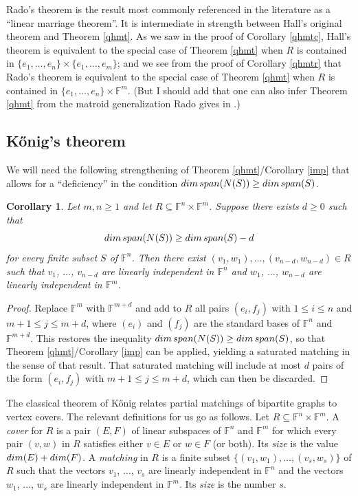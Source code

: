 \documentclass[10pt,a4paper]{amsart}
\newtheorem{cor}[thm]{Corollary}
\begin{document}
Rado's theorem is the result most commonly referenced in the literature as a ``linear marriage theorem''. It is intermediate in strength between Hall's original theorem and Theorem \ref{qhmt}. As we saw in the proof of Corollary \ref{qhmtc}, Hall's theorem is equivalent to the special case of Theorem \ref{qhmt} when $R$ is contained in $\{e_1, \ldots, e_n\} \times \{e_1, \ldots, e_m\}$; and we see from the proof of Corollary \ref{qhmtr} that Rado's theorem is equivalent to the special case of Theorem \ref{qhmt} when $R$ is contained in $\{e_1, \ldots, e_n\} \times \mathbb{F}^m$. (But I should add that one can also infer Theorem \ref{qhmt} from the matroid generalization Rado gives in \cite[Theorem 3]{rado}.)

\subsection{Kőnig's theorem}

We will need the following strengthening of Theorem \ref{qhmt}/Corollary \ref{imp} that allows for a ``deficiency'' in the condition ${\rm dim}\, {\rm span}(N(S)) \geq {\rm dim}\, {\rm span}(S)$.

\begin{cor}\label{dqhmt}
Let $m,n \geq 1$ and let $R \subseteq \mathbb{F}^n \times \mathbb{F}^m$. Suppose there exists $d \geq 0$ such that $${\rm dim}\, {\rm span}(N(S)) \geq {\rm dim}\, {\rm span}(S) - d$$ for every finite subset $S$ of $\mathbb{F}^n$. Then there exist $(v_1,w_1), \ldots, (v_{n-d},w_{n-d}) \in R$ such that $v_1$, $\ldots$, $v_{n-d}$ are linearly independent in $\mathbb{F}^n$ and $w_1$, $\ldots$, $w_{n-d}$ are linearly independent in $\mathbb{F}^m$.
\end{cor}

\begin{proof} 
Replace $\mathbb{F}^m$ with $\mathbb{F}^{m+d}$ and add to $R$ all pairs $(e_i, f_j)$ with $1 \leq i \leq n$ and $m+1 \leq j \leq m + d$, where $(e_i)$ and $(f_j)$ are the standard bases of $\mathbb{F}^n$ and $\mathbb{F}^{m+d}$. This restores the inequality ${\rm dim}\, {\rm span}(N(S)) \geq {\rm dim}\, {\rm span}(S)$, so that Theorem \ref{qhmt}/Corollary \ref{imp} can be applied, yielding a saturated matching in the sense of that result. That saturated matching will include at most $d$ pairs of the form $(e_i,f_j)$ with $m+1 \leq j \leq m + d$, which can then be discarded.
\end{proof}

The classical theorem of Kőnig \cite{konig} relates partial matchings of bipartite graphs to vertex covers. The relevant definitions for us go as follows. Let $R \subseteq \mathbb{F}^n \times \mathbb{F}^m$. A {\it cover} for $R$ is a pair $(E,F)$ of linear subspaces of $\mathbb{F}^n$ and $\mathbb{F}^m$ for which every pair $(v,w)$ in $R$ satisfies either $v \in E$ or $w \in F$ (or both). Its {\it size} is the value ${\rm dim}(E) + {\rm dim}(F)$. A {\it matching} in $R$ is a finite subset $\{(v_1, w_1), \ldots, (v_s, w_s)\}$ of $R$ such that the vectors $v_1$, $\ldots$, $v_s$ are linearly independent in $\mathbb{F}^n$ and the vectors $w_1$, $\ldots$, $w_s$ are linearly independent in $\mathbb{F}^m$. Its {\it size} is the number $s$.
\end{document}

